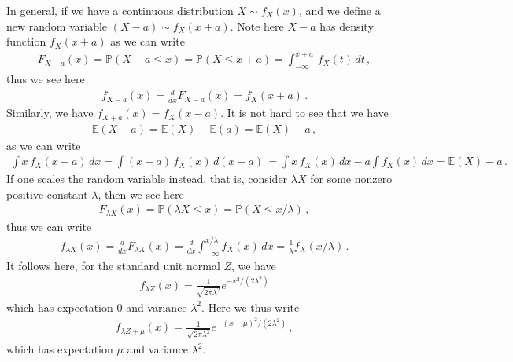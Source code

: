 \documentclass[11pt, onesided]{book}
\theoremstyle{break}
\theoremstyle{break}
\begin{document}
In general, if we have a continuous distribution $X \sim f_X(x)$, and we define a new random variable $(X-a)\sim f_X(x+a)$. Note here $X-a$ has density function $f_X(x+a)$ as we can write
\begin{align*}
F_{X-a}(x) = \mathbb{P}(X-a\leq x) = \mathbb{P}(X\leq x+a) = \int_{-\infty}^{x+a} \, f_X(t)\, dt\,,
\end{align*}
thus we see here
\begin{align*}
f_{X-a}(x) = \frac{d}{dx}F_{X-a}(x) = f_X(x+a)\,.
\end{align*}
Similarly, we have $f_{X+a}(x) = f_X(x-a)$. It is not hard to see that we have
\begin{align*}
\mathbb{E}(X-a) = \mathbb{E}(X) - \mathbb{E}(a) = \mathbb{E}(X) - a\,,
\end{align*} 
as we can write
\begin{align*}
\int x\, f_X(x+a)\, dx = \int (x-a) \, f_X(x)\, d(x-a) \, = \int x\, f_X(x)\, dx -a \int f_X(x)\, dx = \mathbb{E}(X) - a\,. 
\end{align*}
If one scales the random variable instead, that is, consider $\lambda X$ for some nonzero positive constant $\lambda$, then we see here
\begin{align*}
F_{\lambda X} (x) = \mathbb{P}(\lambda X\leq x) = \mathbb{P}(X\leq x/\lambda)\,,
\end{align*}
thus we can write
\begin{align*}
f_{\lambda X}(x) = \frac{d}{dx}F_{\lambda X}(x) = \frac{d}{dx}\int_{-\infty}^{x/\lambda} f_X(x)\, dx = \frac{1}{\lambda}f_X(x/\lambda)\,.
\end{align*}
It follows here, for the standard unit normal $Z$, we have 
\begin{align*}
f_{\lambda Z}(x)  = \frac{1}{\sqrt{2\pi \lambda^2}}e^{-x^2/(2\lambda^2)}
\end{align*}
which has expectation $0$ and variance $\lambda^2$. Here we thus write
\begin{align*}
f_{\lambda Z + \mu}(x) = \frac{1}{\sqrt{2\pi \lambda^2}}e^{-(x-\mu)^2/(2\lambda^2)}\,,
\end{align*}
which has expectation $\mu$ and variance $\lambda^2$.\\
\end{document}

